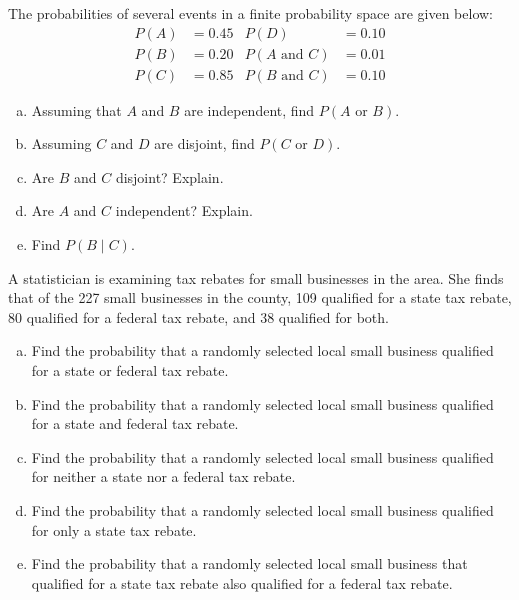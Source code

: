 \documentclass[11pt,letterpaper]{article}
\begin{document}

 The probabilities of several events in a finite probability space are given below:
	\[
	\begin{aligned}
	P(A)&= 0.45 & P(D)&= 0.10 \\
	P(B)&= 0.20 & P(A \text{ and } C)&= 0.01 \\
	P(C)&= 0.85 & P(B \text{ and } C)&= 0.10 
	\end{aligned}
	\] 
\begin{enumerate}[(a)]
\item Assuming that $A$ and $B$ are independent, find $P(A \text{ or } B)$.
\item Assuming $C$ and $D$ are disjoint, find $P(C \text{ or } D)$.
\item Are $B$ and $C$ disjoint? Explain.
\item Are $A$ and $C$ independent? Explain. 
\item Find $P(B \;|\; C)$.
\end{enumerate}



\newpage



 A statistician is examining tax rebates for small businesses in the area. She finds that of the 227 small businesses in the county, 109 qualified for a state tax rebate, 80 qualified for a federal tax rebate, and 38 qualified for both. 
	\begin{enumerate}[(a)]
	\item Find the probability that a randomly selected local small business qualified for a state or federal tax rebate. 
	\item Find the probability that a randomly selected local small business qualified for a state and federal tax rebate. 
	\item Find the probability that a randomly selected local small business qualified for neither a state nor a federal tax rebate. 
	\item Find the probability that a randomly selected local small business qualified for only a state tax rebate. 
	\item Find the probability that a randomly selected local small business that qualified for a state tax rebate also qualified for a federal tax rebate. 
	\end{enumerate}
\end{document}
